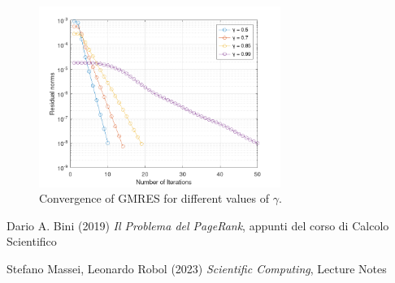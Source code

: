 \documentclass[a4paper]{article}
\theoremstyle{definition}
\theoremstyle{definition}
\theoremstyle{remark}
\theoremstyle{definition}
\begin{document}
\begin{figure}[ht]
\centering
\includegraphics[width=0.7\textwidth]{convergence.png}
\caption{Convergence of GMRES for different values of $\gamma$.}
\label{fig:conv}
\end{figure}

\begin{thebibliography}{4}
Dario A. Bini (2019) \emph{Il Problema del PageRank}, appunti del corso di Calcolo Scientifico

Stefano Massei, Leonardo Robol (2023) \emph{Scientific Computing}, Lecture Notes
\end{thebibliography}
\end{document}

